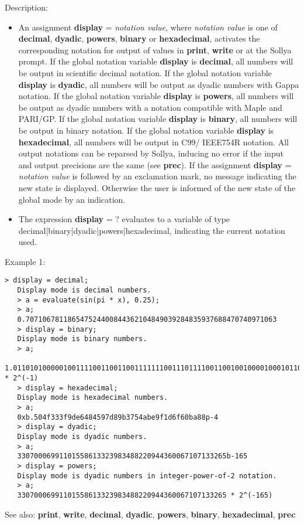 \noindent Description: \begin{itemize}

\item An assignment \textbf{display} = \emph{notation value}, where \emph{notation value} is
   one of \textbf{decimal}, \textbf{dyadic}, \textbf{powers}, \textbf{binary} or \textbf{hexadecimal}, activates
   the corresponding notation for output of values in \textbf{print}, \textbf{write} or
   at the Sollya prompt.
   If the global notation variable \textbf{display} is \textbf{decimal}, all numbers will
   be output in scientific decimal notation.  If the global notation
   variable \textbf{display} is \textbf{dyadic}, all numbers will be output as dyadic
   numbers with Gappa notation.  If the global notation variable \textbf{display}
   is \textbf{powers}, all numbers will be output as dyadic numbers with a
   notation compatible with Maple and PARI/GP.  If the global notation
   variable \textbf{display} is \textbf{binary}, all numbers will be output in binary
   notation.  If the global notation variable \textbf{display} is \textbf{hexadecimal},
   all numbers will be output in C99/ IEEE754R notation.  All output
   notations can be reparsed by Sollya, inducing no error if the input
   and output precisions are the same (see \textbf{prec}).
   If the assignment \textbf{display} = \emph{notation value} is followed by an
   exclamation mark, no message indicating the new state is
   displayed. Otherwise the user is informed of the new state of the
   global mode by an indication.

\item The expression \textbf{display} = ? evaluates to a variable of type
   \textsf{decimal|binary|dyadic|powers|hexadecimal}, indicating the current notation used.
\end{itemize}
\noindent Example 1: 
\begin{center}\begin{minipage}{14.8cm}\begin{Verbatim}[frame=single]
   > display = decimal;
   Display mode is decimal numbers.
   > a = evaluate(sin(pi * x), 0.25);
   > a;
   0.707106781186547524400844362104849039284835937688470740971063
   > display = binary;
   Display mode is binary numbers.
   > a;
   1.01101010000010011110011001100111111100111011110011001001000010001011001011111011000100110110011011101010100101010111110100111110001110101101111011000001011101010001_2 * 2^(-1)
   > display = hexadecimal;
   Display mode is hexadecimal numbers.
   > a;
   0xb.504f333f9de6484597d89b3754abe9f1d6f60ba88p-4
   > display = dyadic;
   Display mode is dyadic numbers.
   > a;
   33070006991101558613323983488220944360067107133265b-165
   > display = powers;
   Display mode is dyadic numbers in integer-power-of-2 notation.
   > a;
   33070006991101558613323983488220944360067107133265 * 2^(-165)
\end{Verbatim}
\end{minipage}\end{center}
See also: \textbf{print}, \textbf{write}, \textbf{decimal}, \textbf{dyadic}, \textbf{powers}, \textbf{binary}, \textbf{hexadecimal}, \textbf{prec}
